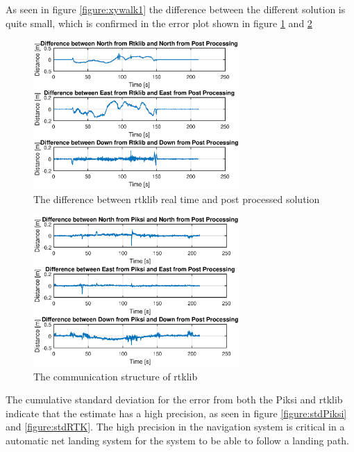 As seen in figure \ref{figure:xywalk1} the difference between the different solution is quite small, which is confirmed in the error plot shown in figure \ref{figure:errorRTKwalk1} and \ref{figure:errorPiksiwalk1}
\begin{figure}[H]
	\centering
		\includegraphics[width=0.7\textwidth]{figs/plots/ertkpost.eps}
		\caption{The difference between rtklib real time and post processed solution}
		\label{figure:errorRTKwalk1}
\end{figure}
\begin{figure}[H]
	\centering
		\includegraphics[width=0.7\textwidth]{figs/plots/epiksiport.eps}
		\caption{The communication structure of rtklib}
		\label{figure:errorPiksiwalk1}
\end{figure}
The cumulative standard deviation for the error from both the Piksi and \gls{rtklib} indicate that the estimate has a high precision, as seen in figure \ref{figure:stdPiksi} and \ref{figure:stdRTK}. The high precision in the navigation system is critical in a automatic net landing system for the system to be able to follow a landing path.
